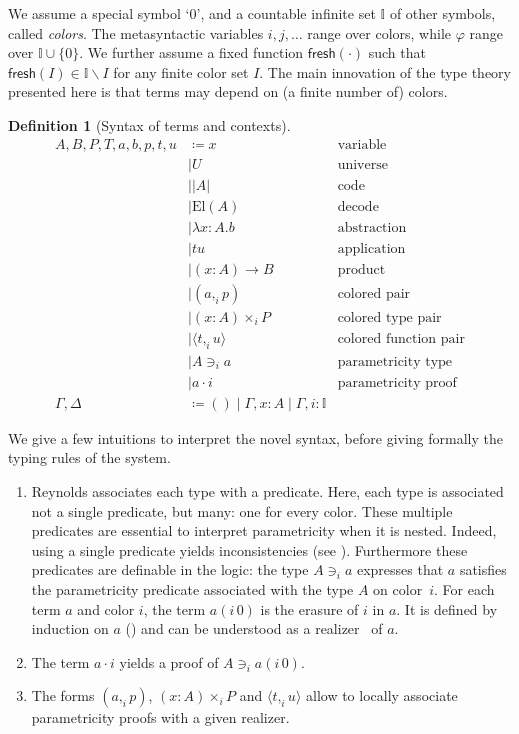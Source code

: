\documentclass[english]{PaperTools/latex/entcs}
\theoremstyle{plain}
\theoremstyle{definition}
\newtheorem{definition}[theorem]{Definition}
\theoremstyle{remark}
\newcommand\CP[3]{(#2,_{#1} #3)}
\newcommand\CTimes[2]{(#2) ×_{#1}}
\newcommand\param[1]{\!\cdot\!#1}
\newcommand\op[1]{∋_{#1}}
\newcommand\fp[3]{⟨#2 ,_{#1} #3⟩}
\newcommand\mor[2]{({#1}\,{#2})}
\newcommand\proj[2]{{#2}\mor{#1}0}
\def\fresh#1{\mathsf{fresh}(#1)}
\def\El#1{\mathrm{El}(#1)}
\begin{document}
We assume a special symbol ‘0’, and a countable infinite set $𝕀$ of
other symbols, called \emph{colors}.
The metasyntactic variables $i,j,\ldots$ range over colors,
while $φ$ range over $𝕀 ∪ \{0\}$.
We further assume a fixed function $\fresh{·}$ such that
$\fresh{I} ∈ 𝕀 \backslash I$ for any finite color set $I$.
%
The main innovation of the type theory
presented here is that terms may depend on (a finite number of)
colors.
\begin{definition}[Syntax of terms and contexts]
  \begin{align*}
    A,B,P,T,a,b,p,t,u &
              \coloneqq x & \text {variable} \\
            & \mid U & \text{universe} \\ 
            & \mid |A| & \text{code} \\ 
            & \mid \El{A} & \text{decode} \\
            & \mid λx:A. b & \text{abstraction} \\
            & \mid t u & \text{application} \\ 
            & \mid (x:A) → B & \text{product} \\
            & \mid \CP i a p & \text{colored pair} \\
            & \mid \CTimes i {x:A} P & \text{colored type pair} \\
            & \mid \fp i t u & \text{colored function pair}\\
            & \mid A \op i a & \text{parametricity type} \\
            & \mid a \param i & \text{parametricity proof} \\
    \Gamma,\Delta & \coloneqq () \mid \Gamma,x:A \mid \Gamma,i:𝕀
  \end{align*}
\end{definition}

We give a few intuitions to interpret the novel syntax, before giving formally the typing rules of the system. 
\begin{enumerate}
\item Reynolds associates each type with a
  predicate. Here, each type is associated not a single predicate, but
  many: one for every color.
  These multiple predicates are essential to interpret parametricity when
  it is nested.  Indeed, using a single predicate yields
  inconsistencies (see ).
  Furthermore these predicates are definable
  in the logic: the type $A \op i a$ expresses that $a$ satisfies
  the parametricity predicate associated with the type $A$ on color~$i$.
  For each term $a$ and color $i$, the term $\proj i a$ is the erasure
  of $i$ in $a$.  It is defined by induction on $a$
  () and can be understood as a
  realizer~\cite{bernardy_realizability_2011} of $a$.
\item The term $a \param i$ yields a proof of $A \op i \proj i a$.
\item The forms $\CP i a p$, $\CTimes i {x:A} P$ and $\fp i t u$ allow to
  locally associate parametricity proofs with a given realizer.
\end{enumerate}
\end{document}
